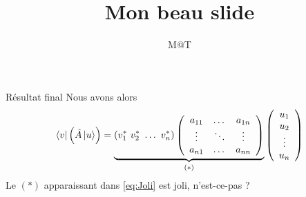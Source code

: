 \documentclass[11pt]{beamer}
\author{M@T}
\title{Mon beau slide}
\begin{document}
\begin{frame}
\titlepage
\end{frame}

\begin{frame}{Résultat final}
Nous avons alors
\begin{equation}
\bra{v}\left(\hat{A}\ket{u}\right) = \underbrace{(v_1^*\ v_2^*\ \dots\ v_n^*)\left(\begin{array}{ccc}
a_{11} & \dots & a_{1n}\\
\vdots &\ddots &\vdots\\
a_{n1} & \dots & a_{nn}
\end{array}\right)}_{(*)}\left(\begin{array}{c}
u_1\\
u_2\\
\vdots\\
u_n
\end{array}\right)
\label{eq:Joli}
\end{equation}
Le $(*)$ apparaissant dans \autoref{eq:Joli} est joli, n'est-ce-pas ? 
\end{frame}
\end{document}
